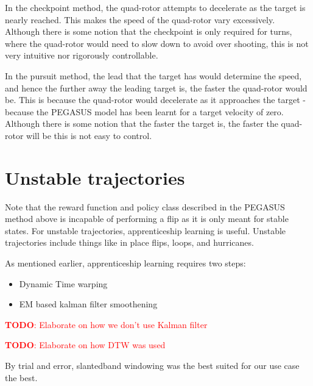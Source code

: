 \documentclass[hidelinks,BTech]{iitmdiss}
\newcommand\todo[1]{\textcolor{red}{{\bf TODO}: #1}}
\begin{document}
In the checkpoint method, the quad-rotor attempts to decelerate as the target is nearly reached. This makes the speed of the quad-rotor vary excessively. Although there is some notion that the checkpoint is only required for turns, where the quad-rotor would need to slow down to avoid over shooting, this is not very intuitive nor rigorously controllable.

In the pursuit method, the lead that the target has would determine the speed, and hence the further away the leading target is, the faster the quad-rotor would be. This is because the quad-rotor would decelerate as it approaches the target - because the PEGASUS model has been learnt for a target velocity of zero. Although there is some notion that the faster the target is, the faster the quad-rotor will be this is not easy to control.

\section{Unstable trajectories}
Note that the reward function and policy class described in the PEGASUS method above is incapable of performing a flip as it is only meant for stable states. For unstable trajectories, apprenticeship learning is useful. Unstable trajectories include things like in place flips, loops, and hurricanes.

As mentioned earlier, apprenticeship learning requires two steps:
\begin{itemize}
\item{Dynamic Time warping}
\item{EM based kalman filter smoothening}
\end{itemize}

\todo{Elaborate on how we don't use Kalman filter}

\todo{Elaborate on how DTW was used}

By trial and error, slantedband windowing was the best suited for our use case the best.


\begin{singlespace}
  \pagebreak
  \clearpage
  
\end{singlespace}
\end{document}

